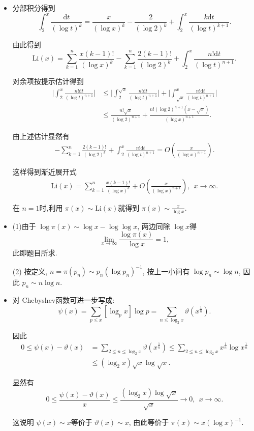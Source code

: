 \begin{itemize}
    
    \item[5.3.1] 分部积分得到
$$\int_2^x \frac{\mathrm{d}t}{(\log t)^k} 
= \frac{x}{(\log x)^k} - \frac{2}{(\log 2)^k} 
+ \int_2^x \frac{k \mathrm{d}t}{(\log t)^{k+1}}. $$
   
由此得到
$$\text{Li}(x) = \sum_{k=1}^n \frac{x(k-1)!}{(\log x)^k} 
- \sum_{k=1}^n\frac{2(k-1)!}{(\log 2)^k} 
+ \int_2^x \frac{n! \mathrm{d}t}{(\log t)^{n+1}}. $$

对余项按提示估计得到
\begin{align*}
    \bigg|\int_2^x \frac{n! \mathrm{d}t}{(\log t)^{n+1}}\bigg|
    &\le \bigg|\int_2^{\sqrt{x}} \frac{n! \mathrm{d}t}{(\log t)^{n+1}}\bigg|
    +\bigg|\int^x_{\sqrt{x}} \frac{n! \mathrm{d}t}{(\log t)^{n+1}}\bigg|\\
    & \le \frac{n! \sqrt{x}}{(\log 2)^{n+1}}
    + \frac{n! (\log 2)^{n+1}(x-\sqrt{x})}{(\log x)^{n+1}}.
\end{align*}

由上述估计显然有
\begin{align*}
    - \sum_{k=1}^n\frac{2(k-1)!}{(\log 2)^k} 
    + \int_2^x \frac{n! \mathrm{d}t}{(\log t)^{n+1}}  
    =  O\left( \frac{x}{(\log x)^{n+1}} \right).
\end{align*}

这样得到渐近展开式
\begin{align*}
    \text{Li}(x) = \sum_{k=1}^n \frac{x(k-1)!}{(\log x)^k}
    + O\left( \frac{x}{(\log x)^{n+1}} \right),\ \ x\to \infty.
\end{align*}

在 $n=1$时,利用 $\pi(x)\sim \text{Li}(x)$就得到 $\pi(x)\sim \frac{x}{\log x}$.

    \item[5.3.2] (1)由于 $\log \pi(x) \sim  \log x -\log\log x$, 
    两边同除 $\log x$得
    $$\lim_{x \to \infty}\frac{\log \pi(x)}{\log x} = 1, $$
    此即题目所求.

    (2) 按定义, $n = \pi(p_n) \sim p_n( \log p_n)^{-1}$, 
    按上一小问有 $\log p_n \sim \log n$, 因此 $p_n \sim n\log n$.
    
    \item[5.3.3] 对 Chebyshev函数可进一步写成:
$$\psi(x) = \sum_{p\le x}[\log_{p}x]\log p 
= \sum_{n\le \log_2 x}\vartheta(x^{\frac{1}{n}}).$$
      
因此
\begin{align*}
    0\le \psi(x) - \vartheta(x) 
    &= \sum_{2\le n\le \log_2 x}\vartheta(x^{\frac{1}{n}})
    \le \sum_{2\le n \le \log_2 x}x^{\frac{1}{n}}\log x^{\frac{1}{n}}\\
    &\le (\log_2 x)\sqrt{x}\log\sqrt{x}.
\end{align*}

显然有 
$$0\le \frac{\psi(x) - \vartheta(x) }{x}
\le \frac{(\log_2 x)\log\sqrt{x}}{\sqrt{x}}\to 0,\ \ x\to \infty.$$

这说明 $\psi(x)\sim x$等价于 $\vartheta(x) \sim x$, 
由此等价于 $\pi(x)\sim x(\log x)^{-1}$.
\end{itemize}

